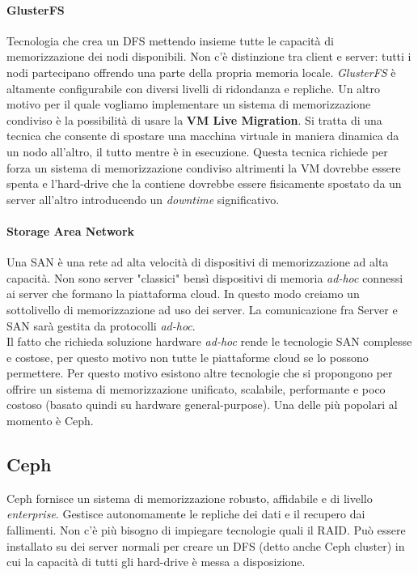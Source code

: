\documentclass{article}
\begin{document}
\paragraph{GlusterFS} Tecnologia che crea un DFS mettendo insieme tutte le capacità di memorizzazione dei nodi disponibili. Non c'è distinzione tra client e server: tutti i nodi partecipano offrendo una parte della propria memoria locale. \textit{GlusterFS} è altamente configurabile con diversi livelli di ridondanza e repliche.
Un altro motivo per il quale vogliamo implementare un sistema di memorizzazione condiviso è la possibilità di usare la \textbf{VM Live Migration}. Si tratta di una tecnica che consente di spostare una macchina virtuale in maniera dinamica da un nodo all'altro, il tutto mentre è in esecuzione. Questa tecnica richiede per forza un sistema di memorizzazione condiviso altrimenti la VM dovrebbe essere spenta e l'hard-drive che la contiene dovrebbe essere fisicamente spostato da un server all'altro introducendo un \textit{downtime} significativo.

\paragraph{Storage Area Network} Una SAN è una rete ad alta velocità di dispositivi di memorizzazione ad alta capacità. Non sono server "classici" bensì dispositivi di memoria \textit{ad-hoc} connessi ai server che formano la piattaforma cloud. In questo modo creiamo un sottolivello di memorizzazione ad uso dei server. La comunicazione fra Server e SAN sarà gestita da protocolli \textit{ad-hoc}.\\
Il fatto che richieda soluzione hardware \textit{ad-hoc} rende le tecnologie SAN complesse e costose, per questo motivo non tutte le piattaforme cloud se lo possono permettere. Per questo motivo esistono altre tecnologie che si propongono per offrire un sistema di memorizzazione unificato, scalabile, performante e poco costoso (basato quindi su hardware general-purpose). Una delle più popolari al momento è Ceph.

\subsection{Ceph}
Ceph fornisce un sistema di memorizzazione robusto, affidabile e di livello \textit{enterprise}. Gestisce autonomamente le repliche dei dati e il recupero dai fallimenti. Non c'è più bisogno di impiegare tecnologie quali il RAID. Può essere installato su dei server normali per creare un DFS (detto anche Ceph cluster) in cui la capacità di tutti gli hard-drive è messa a disposizione.
\end{document}
